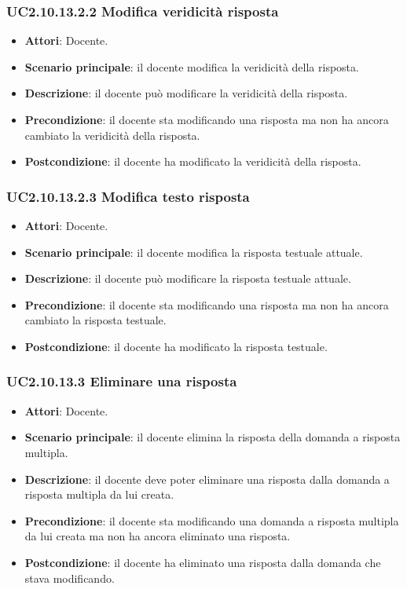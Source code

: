 \subsubsection{UC2.10.13.2.2 Modifica veridicità risposta}
\begin{itemize}
\item \textbf{Attori}: Docente.
\item \textbf{Scenario principale}: il docente modifica la veridicità della risposta.
\item \textbf{Descrizione}: il docente può modificare la veridicità della risposta.
\item \textbf{Precondizione}: il docente sta modificando una risposta ma non ha ancora cambiato la veridicità della risposta.
\item \textbf{Postcondizione}: il docente ha modificato la veridicità della risposta.
\end{itemize}
\subsubsection{UC2.10.13.2.3 Modifica testo risposta}
\begin{itemize}
\item \textbf{Attori}: Docente.
\item \textbf{Scenario principale}: il docente modifica la risposta testuale attuale.
\item \textbf{Descrizione}: il docente può modificare la risposta testuale attuale.
\item \textbf{Precondizione}: il docente sta modificando una risposta ma non ha ancora cambiato la risposta testuale.
\item \textbf{Postcondizione}: il docente ha modificato la risposta testuale.
\end{itemize}
\subsubsection{UC2.10.13.3 Eliminare una risposta}
\begin{itemize}
\item \textbf{Attori}: Docente.
\item \textbf{Scenario principale}: il docente elimina la risposta della domanda a risposta multipla.
\item \textbf{Descrizione}: il docente deve poter eliminare una risposta dalla domanda a risposta multipla da lui creata.
\item \textbf{Precondizione}: il docente sta modificando una domanda a risposta multipla da lui creata ma non ha ancora eliminato una risposta.
\item \textbf{Postcondizione}: il docente ha eliminato una risposta dalla domanda che stava modificando.
\end{itemize}
